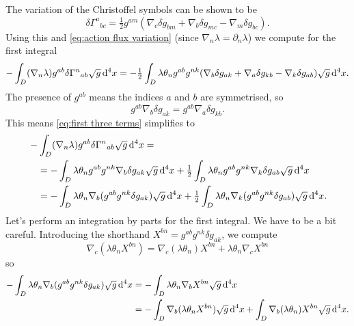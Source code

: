 \documentclass[../main.tex]{subfiles}
\begin{document}
The variation of the Christoffel symbols can be shown to be
\begin{equation} \label{eq:variation christoffel symbols}
	\delta {\Gamma^a}_{bc} = \tfrac{1}{2} g^{am}(\nabla_c \delta g_{bm} + \nabla_b \delta
	g_{mc} - \nabla_m \delta g_{bc}).
\end{equation}
Using this and \cref{eq:action flux variation} (since \( \nabla_n \lambda = \partial_n
\lambda \)) we compute for the first integral
\begin{equation}\label{eq:first three terms}
	-\int_D (\nabla_n \lambda) g^{ab} \delta{\Gamma^n}_{ab} \sqrt{g} \,\mathrm{d}^4 x = -
	\tfrac{1}{2} \int_D \lambda\theta_n g^{ab} g^{nk}(\nabla_b \delta g_{ak} + \nabla_a
	\delta g_{kb} - \nabla_k \delta g_{ab}) \sqrt{g} \,\mathrm{d}^4 x. 
\end{equation}
The presence of \( g^{ab} \) means the indices \( a \) and \( b \) are symmetrised, so
\begin{equation*}
	g^{ab} \nabla_b \delta g_{ak} = g^{ab} \nabla_a \delta g_{kb}. 
\end{equation*}
This means \cref{eq:first three terms} simplifies to
\begin{align}
	&	-\int_D (\nabla_n \lambda) g^{ab} \delta{\Gamma^n}_{ab} \sqrt{g} \,\mathrm{d}^4 x = \notag \\
	& \quad = - \int_D \lambda \theta_n g^{ab}g^{nk} \nabla_b \delta g_{ak} \sqrt{g} \,\mathrm{d}^4 x
	+ \tfrac{1}{2} \int_D \lambda \theta_n g^{ab}g^{nk} \nabla_k \delta g_{ab} \sqrt{g}
	\,\mathrm{d}^4 x \notag \\
	& \quad = - \int_D \lambda \theta_n \nabla_b (g^{ab}g^{nk} \delta g_{ak}) \sqrt{g} \,\mathrm{d}^4 x
	+ \tfrac{1}{2} \int_D \lambda \theta_n \nabla_k (g^{ab}g^{nk}\delta g_{ab}) \sqrt{g}
	\,\mathrm{d}^4 x. \label{eq:two integrals}
\end{align}
Let's perform an integration by parts for the first integral. We have to be a bit
careful. Introducing the shorthand \( X^{bn} = g^{ab}g^{nk}\delta g_{ak} \), we compute
\begin{equation*}
	\nabla_c(\lambda\theta_n X^{bn}) = \nabla_c(\lambda \theta_n)X^{bn} + \lambda \theta_n
	\nabla_c X^{bn}
\end{equation*}
so
\begin{align*}
	-\int_D \lambda \theta_n \nabla_b (g^{ab}g^{nk} \delta g_{ak})\sqrt{g}\,\mathrm{d}^4x 
	& = - \int_D \lambda \theta_n \nabla_bX^{bn} \sqrt{g} \,\mathrm{d}^4 x \\
	& = - \int_D \nabla_b(\lambda \theta_n X^{bn})\sqrt{g}\,\mathrm{d}^4x + \int_{D}
	\nabla_b(\lambda\theta_n)X^{bn}\sqrt{g}\,\mathrm{d}^4x. 
\end{align*}
\end{document}
